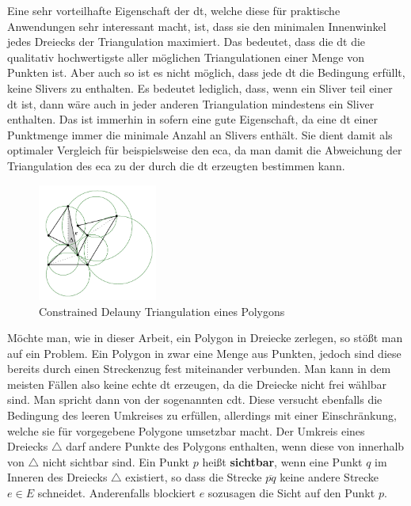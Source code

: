 Eine sehr vorteilhafte Eigenschaft der \ac{dt}, welche diese für praktische Anwendungen sehr interessant macht, ist, dass sie den minimalen Innenwinkel jedes Dreiecks der Triangulation maximiert. Das bedeutet, dass die \ac{dt} die qualitativ hochwertigste aller möglichen Triangulationen
einer Menge von Punkten ist. Aber auch so ist es nicht möglich, dass jede \ac{dt} die Bedingung erfüllt, keine Slivers zu enthalten. Es bedeutet lediglich, dass, wenn ein Sliver teil einer \ac{dt} ist, dann wäre auch in jeder anderen Triangulation mindestens ein Sliver enthalten.
Das ist immerhin in sofern eine gute Eigenschaft, da eine \ac{dt} einer Punktmenge immer die minimale Anzahl an Slivers enthält. Sie dient damit als optimaler Vergleich für beispielsweise den \ac{eca}, da man damit die Abweichung der Triangulation des \ac{eca} zu der durch die \ac{dt} erzeugten bestimmen kann. 

\begin{figure}
    \centering
    \includegraphics[width=0.35\textwidth]{bilder/cdt.png}
    \caption[Constrained Delauny Triangulation für ein Polygon]{Constrained Delauny Triangulation eines Polygons\cite{delauny}}
    \label{fig:cdt}
\end{figure}
Möchte man, wie in dieser Arbeit, ein Polygon in Dreiecke zerlegen, so stößt man auf ein Problem. Ein Polygon in zwar eine Menge aus Punkten, jedoch sind diese bereits durch einen Streckenzug fest miteinander verbunden. Man kann in dem meisten Fällen also keine echte \ac{dt} erzeugen, 
da die Dreiecke nicht frei wählbar sind. Man spricht dann von der sogenannten \ac{cdt}. Diese versucht ebenfalls die Bedingung des leeren Umkreises zu erfüllen, allerdings mit einer Einschränkung, welche sie für vorgegebene Polygone umsetzbar macht.
Der Umkreis eines Dreiecks $\triangle$ darf andere Punkte des Polygons enthalten, wenn diese von innerhalb von $\triangle$ nicht sichtbar sind. Ein Punkt $p$ heißt \textbf{sichtbar}, wenn eine Punkt $q$ im Inneren des Dreiecks $\triangle$ existiert, so dass die Strecke $\overline{pq}$ keine andere Strecke $e \in E$ schneidet.
Anderenfalls blockiert $e$ sozusagen die Sicht auf den Punkt $p$.



